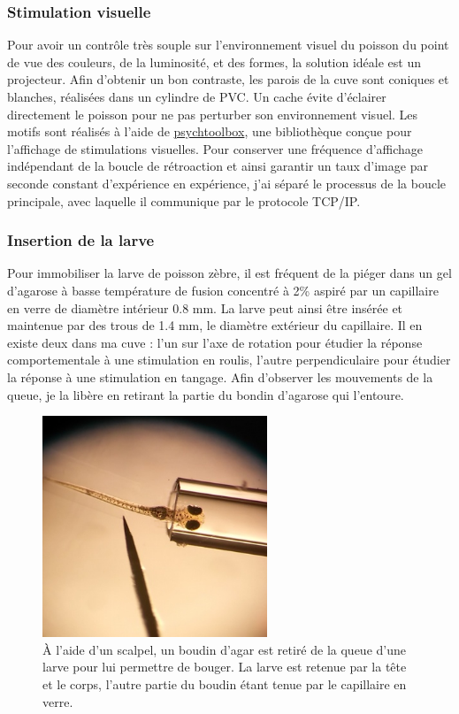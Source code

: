 
\subsubsection{Stimulation visuelle}
Pour avoir un contrôle très souple sur l'environnement visuel du poisson du point de vue des couleurs, de la luminosité, et des formes, la solution idéale est un projecteur. Afin d'obtenir un bon contraste, les parois de la cuve sont coniques et blanches, réalisées dans un cylindre de PVC. Un cache évite d'éclairer directement le poisson pour ne pas perturber son environnement visuel. Les motifs sont réalisés à l'aide de \href{http://psychtoolbox.org/}{psychtoolbox}, une bibliothèque conçue pour l'affichage de stimulations visuelles. Pour conserver une fréquence d'affichage indépendant de la boucle de rétroaction et ainsi garantir un taux d'image par seconde constant d'expérience en expérience, j'ai séparé le processus de la boucle principale, avec laquelle il communique par le protocole TCP/IP.

\subsubsection{Insertion de la larve}
Pour immobiliser la larve de poisson zèbre, il est fréquent de la piéger dans un gel d'agarose à basse température de fusion concentré à 2\% aspiré par un capillaire en verre de diamètre intérieur 0.8 mm. La larve peut ainsi être insérée et maintenue par des trous de 1.4 mm, le diamètre extérieur du capillaire. Il en existe deux dans ma cuve : l'un sur l'axe de rotation pour étudier la réponse comportementale à une stimulation en roulis, l'autre perpendiculaire pour étudier la réponse à une stimulation en tangage. Afin d'observer les mouvements de la queue, je la libère en retirant la partie du bondin d'agarose qui l'entoure. 

\begin{figure}
\centering
\includegraphics[width=0.6\textwidth]{./files/prepa_larve.png}
\caption{À l'aide d'un scalpel, un boudin d'agar est retiré de la queue d'une larve pour lui permettre de bouger. La larve est retenue par la tête et le corps, l'autre partie du boudin étant tenue par le capillaire en verre. }
\end{figure}

